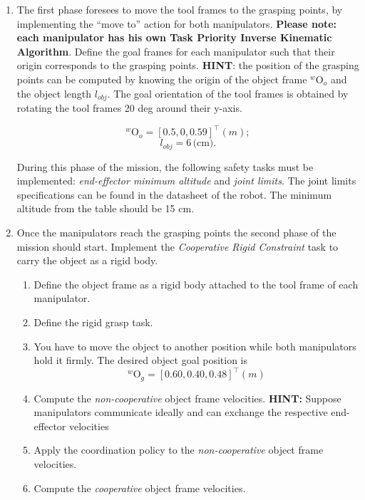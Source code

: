 \documentclass{article}
\begin{document}
\begin{enumerate}
	
\item The first phase foresees to move the tool frames to the grasping points, by implementing the ``move to'' action for both manipulators. \textbf{Please note: each manipulator has his own Task Priority Inverse Kinematic Algorithm}. Define the goal frames for each manipulator such that their origin corresponds to the grasping points. \textbf{HINT}: the position of the grasping points can be computed by knowing the origin of the object frame $^{w}\textrm{O}_{o}$ and the object length $l_{obj}$. The goal orientation of the tool frames is obtained by rotating the tool frames 20 deg around their y-axis.

\begin{equation}
	^{w}\textrm{O}_{o} = [0.5, 0, 0.59]^{\top}(m);
\end{equation}
\begin{equation}
	l_{obj} = 6\,  \text{(cm)}.
\end{equation}

During this phase of the mission, the following safety tasks must be implemented: \textit{end-effector minimum altitude} and \textit{joint limits}. The joint limits specifications can be found in the datasheet of the robot. The minimum altitude from the table should be 15 cm. 

\item Once the manipulators reach the grasping points the second phase of the mission should start. Implement the \textit{Cooperative Rigid Constraint} task to carry the object as a rigid body. 
\begin{enumerate}
	\item Define the object frame as a rigid body attached to the tool frame of each manipulator. 
	\item Define the rigid grasp task. 
	\item You have to move the object to another position while both manipulators hold it firmly. The desired object goal position is
	\begin{equation}
		^{w}\textrm{O}_{g} = [0.60, 0.40, 0.48]^{\top}(m)
	\end{equation}
	\item Compute the \textit{non-cooperative} object frame velocities. \textbf{HINT:} Suppose manipulators communicate ideally and can exchange the respective end-effector velocities
	\item Apply the coordination policy to the \textit{non-cooperative} object frame velocities.
	\item Compute the \textit{cooperative} object frame velocities.
\end{enumerate}


\end{enumerate}
\end{document}
